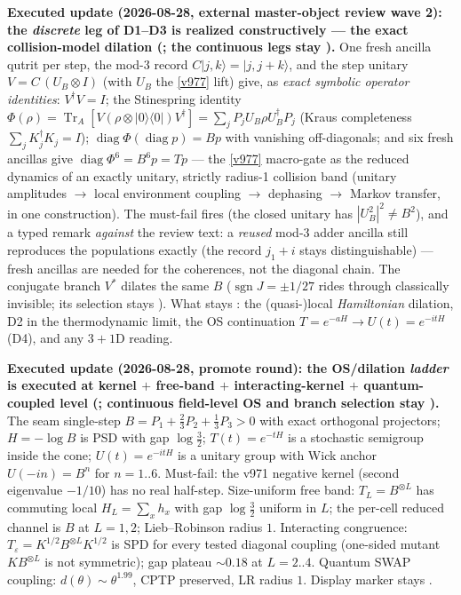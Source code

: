 \documentclass[11pt,a4paper]{article}
\begin{document}
\par\smallskip\noindent\textbf{Executed update (2026-08-28, external master-object review wave
2): the \emph{discrete} leg of D1--D3 is realized constructively --- the exact collision-model
dilation (; the continuous legs stay \mO).}  One fresh
ancilla qutrit per step, the mod-3 record $C|j,k\rangle=|j,j{+}k\rangle$, and the step unitary
$V=C\,(U_B\otimes I)$ (with $U_B$ the \vref{v977} lift) give, as \emph{exact symbolic operator
identities}: $V^\dagger V=I$; the Stinespring identity
$\Phi(\rho)=\operatorname{Tr}_A[V(\rho\otimes|0\rangle\langle0|)V^\dagger]
=\sum_jP_jU_B\rho U_B^\dagger P_j$ (Kraus completeness $\sum_jK_j^\dagger K_j=I$);
$\operatorname{diag}\Phi(\operatorname{diag}p)=Bp$ with vanishing off-diagonals; and six fresh
ancillas give $\operatorname{diag}\Phi^6=B^6p=Tp$ --- the \vref{v977} macro-gate as the reduced
dynamics of an exactly unitary, strictly radius-1 collision band (unitary amplitudes
$\to$ local environment coupling $\to$ dephasing $\to$ Markov transfer, in one construction).
The must-fail fires (the closed unitary has $|U_B^2|^2\neq B^2$), and a typed remark
\emph{against} the review text: a \emph{reused} mod-3 adder ancilla still reproduces the
populations exactly (the record $j_1{+}i$ stays distinguishable) --- fresh ancillas are needed
for the coherences, not the diagonal chain.  The conjugate branch $V^*$ dilates the same $B$
($\operatorname{sgn}J=\pm1/27$ rides through classically invisible; its selection stays \mO).
What stays \mO: the (quasi-)local \emph{Hamiltonian} dilation, D2 in the thermodynamic limit,
the OS continuation $T=e^{-aH}\to U(t)=e^{-itH}$ (D4), and any $3{+}1$D reading.

\par\smallskip\noindent\textbf{Executed update (2026-08-28, promote round): the OS/dilation
\emph{ladder} is executed at kernel $+$ free-band $+$ interacting-kernel $+$ quantum-coupled
level (; continuous
field-level OS and branch selection stay \mO).}
The seam single-step $B=P_1+\tfrac23 P_2+\tfrac13 P_3>0$ with exact orthogonal projectors;
$H=-\log B$ is PSD with gap $\log\tfrac32$; $T(t)=e^{-tH}$ is a stochastic semigroup inside
the cone; $U(t)=e^{-itH}$ is a unitary group with Wick anchor $U(-in)=B^n$ for $n=1..6$.
Must-fail: the v971 negative kernel (second eigenvalue $-1/10$) has no real half-step.
Size-uniform free band: $T_L=B^{\otimes L}$ has commuting local $H_L=\sum_x h_x$ with gap
$\log\tfrac32$ uniform in $L$; the per-cell reduced channel is $B$ at $L=1,2$; Lieb--Robinson
radius $1$.  Interacting congruence: $T_\varepsilon=K^{1/2}B^{\otimes L}K^{1/2}$ is SPD for
every tested diagonal coupling (one-sided mutant $KB^{\otimes L}$ is not symmetric); gap
plateau $\sim0.18$ at $L=2..4$.  Quantum SWAP coupling: $d(\theta)\sim\theta^{1.99}$, CPTP
preserved, LR radius $1$.  Display marker stays \mO.
\end{document}
